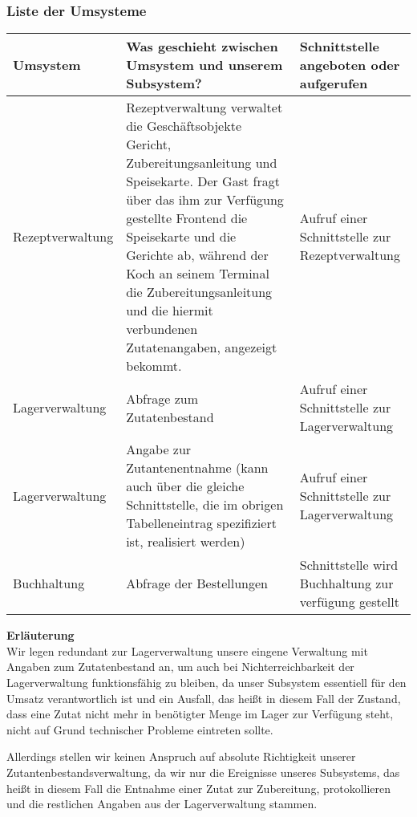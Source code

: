 \subsubsection{Liste der Umsysteme}

\begin{tabu} to \linewidth {X|X|X}
\hline
{}
Umsystem &Was geschieht zwischen Umsystem und unserem Subsystem?
  &Schnittstelle angeboten oder aufgerufen \\
\hline
Rezeptverwaltung &Rezeptverwaltung verwaltet die Gesch\"aftsobjekte Gericht,
  Zubereitungsanleitung und Speisekarte. Der Gast fragt \"uber das ihm zur
  Verf\"ugung gestellte Frontend die Speisekarte und die Gerichte ab, w\"ahrend
  der Koch an seinem Terminal die Zubereitungsanleitung und die hiermit verbundenen
  Zutatenangaben, angezeigt bekommt.

  &Aufruf einer Schnittstelle zur Rezeptverwaltung \\
\hline
Lagerverwaltung &Abfrage zum Zutatenbestand &Aufruf einer Schnittstelle zur
  Lagerverwaltung \\
\hline
Lagerverwaltung &Angabe zur Zutantenentnahme (kann auch \"uber die gleiche
  Schnittstelle, die im obrigen Tabelleneintrag spezifiziert ist, realisiert
  werden)

  &Aufruf einer Schnittstelle zur Lagerverwaltung \\
\hline
Buchhaltung &Abfrage der Bestellungen &Schnittstelle wird Buchhaltung zur verf\"ugung
  gestellt \\
\hline
\end{tabu}

\textbf{Erl\"auterung} \\

Wir legen redundant zur Lagerverwaltung unsere eingene Verwaltung
mit Angaben zum Zutatenbestand an, um auch bei Nichterreichbarkeit
der Lagerverwaltung funktionsf\"ahig zu bleiben, da unser Subsystem
essentiell f\"ur den Umsatz verantwortlich ist und ein Ausfall, das
hei{\ss}t in diesem Fall der Zustand, dass eine Zutat nicht mehr in
ben\"otigter Menge im Lager zur Verf\"ugung steht, nicht auf Grund
technischer Probleme eintreten sollte.

Allerdings stellen wir keinen Anspruch auf absolute Richtigkeit unserer
Zutantenbestandsverwaltung, da wir nur die Ereignisse unseres Subsystems,
das hei{\ss}t in diesem Fall die Entnahme einer Zutat zur Zubereitung,
protokollieren und die restlichen Angaben aus der Lagerverwaltung stammen.

